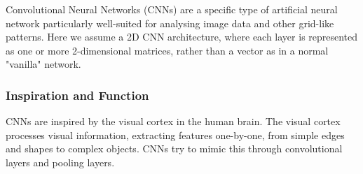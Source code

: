 \documentclass[12pt]{article}
\begin{document}
Convolutional Neural Networks (CNNs) are a specific type of artificial neural network particularly well-suited for analysing image data and other grid-like patterns. 
Here we assume a 2D CNN architecture, where each layer is represented as one or more 2-dimensional matrices, rather than a vector as in a normal "vanilla" network.






\subsubsection*{Inspiration and Function}



CNNs are inspired by 
the visual cortex in the human brain. 
The visual cortex processes visual information, 
extracting features one-by-one, from simple edges and shapes to complex objects.
CNNs try to mimic this 
through convolutional layers and pooling layers. 


\end{document}
